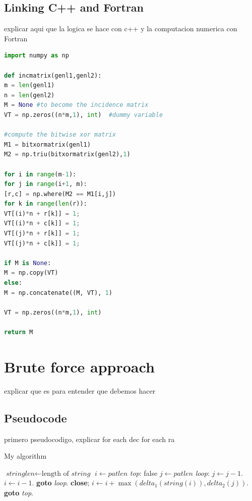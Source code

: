 \subsection{Linking C++ and Fortran}

explicar aqui que la logica se hace con c++ y la computacion numerica con Fortran

\begin{lstlisting}[language=Python, caption=Python example]
import numpy as np

def incmatrix(genl1,genl2):
m = len(genl1)
n = len(genl2)
M = None #to become the incidence matrix
VT = np.zeros((n*m,1), int)  #dummy variable

#compute the bitwise xor matrix
M1 = bitxormatrix(genl1)
M2 = np.triu(bitxormatrix(genl2),1) 

for i in range(m-1):
for j in range(i+1, m):
[r,c] = np.where(M2 == M1[i,j])
for k in range(len(r)):
VT[(i)*n + r[k]] = 1;
VT[(i)*n + c[k]] = 1;
VT[(j)*n + r[k]] = 1;
VT[(j)*n + c[k]] = 1;

if M is None:
M = np.copy(VT)
else:
M = np.concatenate((M, VT), 1)

VT = np.zeros((n*m,1), int)

return M
\end{lstlisting}




\section{Brute force approach}

explicar que es para entender que debemos hacer

\subsection{Pseudocode}

primero pseudocodigo, explicar for each dec for each ra


\begin{algorithm}
	\caption{My algorithm}\label{euclid}
	\begin{algorithmic}[1]
		\State $\textit{stringlen} \gets \text{length of }\textit{string}$
		\State $i \gets \textit{patlen}$
		\BState \emph{top}:
		 \Return false
		\EndIf
		\State $j \gets \textit{patlen}$
		\BState \emph{loop}:
		\State $j \gets j-1$.
		\State $i \gets i-1$.
		\State \textbf{goto} \emph{loop}.
		\State \textbf{close};
		\EndIf
		\State $i \gets i+\max(\textit{delta}_1(\textit{string}(i)),\textit{delta}_2(j))$.
		\State \textbf{goto} \emph{top}.
		\EndProcedure
	\end{algorithmic}
\end{algorithm}

